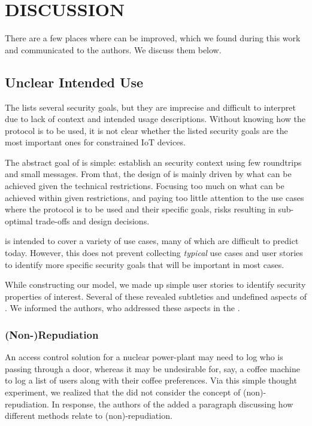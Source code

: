 \documentclass[runningheads]{llncs}
\begin{document}
\section{\uppercase{Discussion}}
\label{sec:discussion}
There are a few places where \mEdhoc{} can be improved,
which we found during this work and communicated to the authors.
%
We discuss them below.
%

\subsection{Unclear Intended Use}
\label{sec:unclearProtocolUse}
%
The \mEdhoc{} \mSpec{} lists several security goals, but they are
imprecise and difficult to interpret due to lack of context and intended usage
descriptions.
%
Without knowing how the protocol is to be used,
it is not clear whether the listed security goals are the most important ones
for constrained IoT devices.
%

The abstract goal of \mEdhoc{} is simple: establish an \mOscore{} security
context using few roundtrips and small messages.
%
From that, the design of \mEdhoc{} is mainly driven by what
can be achieved given the technical restrictions.
%
Focusing too much on what can be achieved within given restrictions, and paying
too little attention to the use cases where the
protocol is to be used and their specific goals, risks resulting in
sub-optimal trade-offs and design decisions.
%

\mEdhoc{} is intended to cover a variety of use cases, many of which are
difficult to predict today.
%
However, this does not
prevent collecting \emph{typical} use cases and user stories
to identify more specific security goals that will be important in most cases.
%

While constructing our model, we made up simple user stories to identify
security properties of interest.
%
Several of these revealed subtleties and undefined aspects of \mEdhoc{}.
%
We informed the \mEdhoc{} authors, who addressed these aspects in the
\mSpec{}.
%

\subsubsection{(Non-)Repudiation}
An access control solution for a nuclear power-plant may need to log who is
passing through a door, whereas it may be undesirable for, say, a coffee
machine to log a list of users along with their coffee preferences.
%
Via this simple thought experiment, we realized that the \mSpec{} did not
consider the concept of (non)-repudiation.
%
In response, the authors of the \mSpec{} added a paragraph discussing how
different methods relate to (non)-repudiation.
\end{document}
